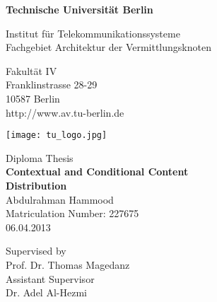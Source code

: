 \thispagestyle{empty}
\begin{center}

\vspace*{1cm}
{\LARGE \textbf{Technische Universität Berlin}}

\vspace{0.5cm}

{\large Institut für Telekommunikationssysteme\\[1mm]}
{\large Fachgebiet Architektur der Vermittlungsknoten\\[5mm]}

Fakultät IV\\
Franklinstrasse 28-29\\
10587 Berlin\\
http://www.av.tu-berlin.de\\
\vspace*{1cm}

\texttt{[image: tu\_logo.jpg]}

\vspace*{1.0cm}

{\LARGE Diploma Thesis}\\

\vspace{1.0cm}
{\LARGE \textbf{Contextual and Conditional Content}}\\
\vspace*{0.5cm}
{\LARGE \textbf{Distribution}}\\
\vspace*{1.0cm}
{\LARGE Abdulrahman Hammood}
\\
\vspace*{0.5cm}
Matriculation Number: 227675\\
06.04.2013\\ %
\vspace*{0.5cm}

Supervised by\\
Prof. Dr. Thomas Magedanz\\
\vspace*{0.5cm}
Assistant Supervisor\\
Dr. Adel Al-Hezmi
\vspace{2cm}


\end{center}

